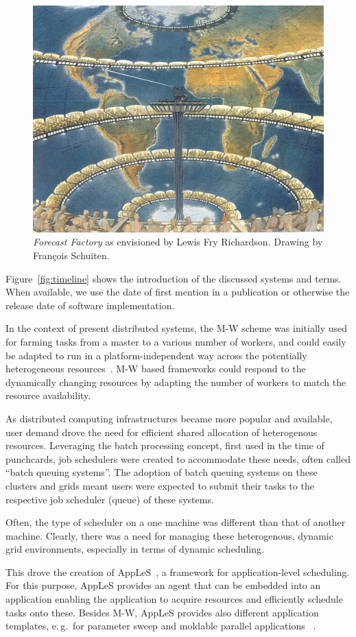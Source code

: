 \documentclass{sig-alternate}
\begin{document}
\begin{figure}[t]
	\centering
		\includegraphics[width=.45\textwidth]{figures/forecast-factory.jpg}
	\caption{\textit{Forecast Factory} as envisioned by Lewis Fry Richardson.
    Drawing by Fran{\c c}ois Schuiten.}
	\label{fig:figures_forecast-factory}
\end{figure}

Figure~\ref{fig:timeline} shows the introduction of the discussed
systems and terms. When available, we use the date of first mention in a
publication or otherwise the release date of software implementation.

In the context of present distributed systems, the M-W scheme was initially
used for farming tasks from a master to a various number of workers, and could
easily be adapted to run in a platform-independent way across the potentially
heterogeneous resources~\cite{masterworker, Goux00anenabling}.
M-W based frameworks could respond to the dynamically changing resources by
adapting the number of workers to match the resource availability.

As distributed computing infrastructures became more popular and available,
user demand drove the need for efficient shared allocation of heterogenous
resources.
Leveraging the batch processing concept, first used in the time
of punchcards, job schedulers were created to accommodate these needs, often
called ``batch queuing systems''.
The adoption of batch queuing systems on these clusters and grids meant users
were expected to submit their tasks to the respective job scheduler (queue) of
these systems.

Often, the type of scheduler on a one machine was different than that of
another machine.
Clearly, there was a need for managing these heterogenous, dynamic grid
environments, especially in terms of dynamic scheduling.

This drove the creation of AppLeS~\cite{Berman:1996:apples}, a framework for
application-level scheduling.
For this purpose, AppLeS provides an agent that can be embedded into an
application enabling the application to acquire resources
and efficiently schedule tasks onto these.
Besides M-W, AppLeS provides also different application templates, e.\,g.\ for
parameter sweep and moldable parallel applications
~\cite{Berman:2003:ACG:766629.766632}.
\end{document}
